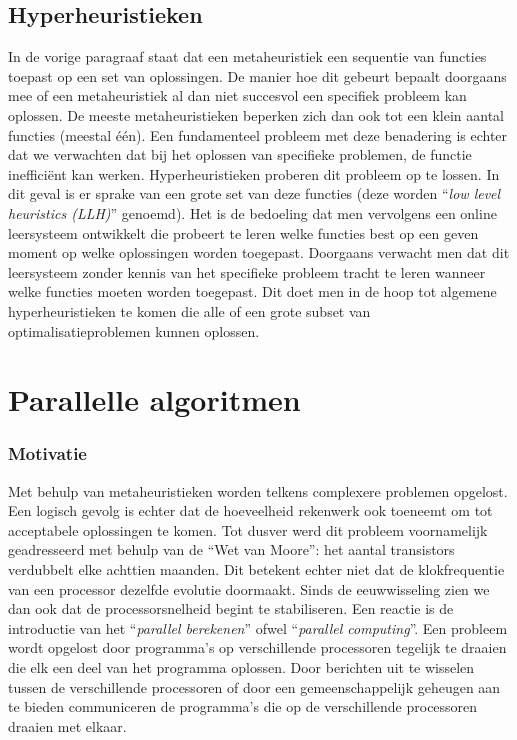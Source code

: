 \subsection{Hyperheuristieken}

In de vorige paragraaf staat dat een metaheuristiek een sequentie van functies toepast op een set van oplossingen. De manier hoe dit gebeurt bepaalt doorgaans mee of een metaheuristiek al dan niet succesvol een specifiek probleem kan oplossen. De meeste metaheuristieken beperken zich dan ook tot een klein aantal functies (meestal \'e\'en). Een fundamenteel probleem met deze benadering is echter dat we verwachten dat bij het oplossen van specifieke problemen, de functie ineffici\"ent kan werken. Hyperheuristieken proberen dit probleem op te lossen. In dit geval is er sprake van een grote set van deze functies (deze worden ``\emph{low level heuristics (LLH)}'' genoemd). Het is de bedoeling dat men vervolgens een online leersysteem ontwikkelt die probeert te leren welke functies best op een geven moment op welke oplossingen worden toegepast. Doorgaans verwacht men dat dit leersysteem zonder kennis van het specifieke probleem tracht te leren wanneer welke functies moeten worden toegepast. Dit doet men in de hoop tot algemene hyperheuristieken te komen die alle of een grote subset van optimalisatieproblemen kunnen oplossen.

\section{Parallelle algoritmen}

\subsubsection{Motivatie}

Met behulp van metaheuristieken worden telkens complexere problemen opgelost. Een logisch gevolg is echter dat de hoeveelheid rekenwerk ook toeneemt om tot acceptabele oplossingen te komen. Tot dusver werd dit probleem voornamelijk geadresseerd met behulp van de ``Wet van Moore''\cite{mooresLaw}: het aantal transistors verdubbelt elke achttien maanden. Dit betekent echter niet dat de klokfrequentie van een processor dezelfde evolutie doormaakt. Sinds de eeuwwisseling zien we dan ook dat de processorsnelheid begint te stabiliseren. Een reactie is de introductie van het ``\emph{parallel berekenen}'' ofwel ``\emph{parallel computing}''. Een probleem wordt opgelost door programma's op verschillende processoren tegelijk te draaien die elk een deel van het programma oplossen. Door berichten uit te wisselen tussen de verschillende processoren of door een gemeenschappelijk geheugen aan te bieden communiceren de programma's die op de verschillende processoren draaien met elkaar.

